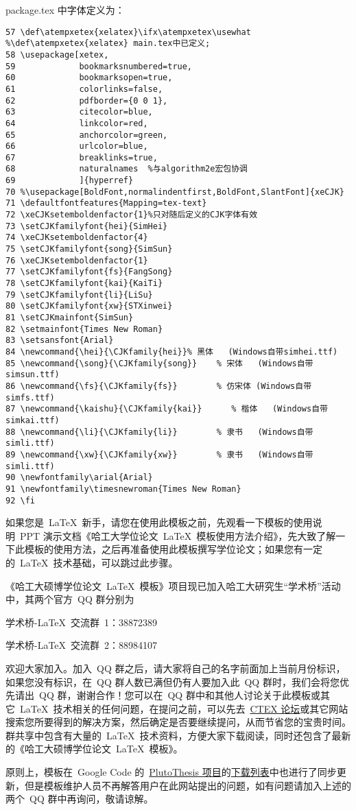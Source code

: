 package.tex 中字体定义为：
\begin{lstlisting}
57 \def\atempxetex{xelatex}\ifx\atempxetex\usewhat %\def\atempxetex{xelatex} main.tex中已定义;
58 \usepackage[xetex,
59             bookmarksnumbered=true,
60             bookmarksopen=true,
61             colorlinks=false,
62             pdfborder={0 0 1},
63             citecolor=blue,
64             linkcolor=red,
65             anchorcolor=green,
66             urlcolor=blue,
67             breaklinks=true,
68             naturalnames  %与algorithm2e宏包协调
69             ]{hyperref}
70 %\usepackage[BoldFont,normalindentfirst,BoldFont,SlantFont]{xeCJK}
71 \defaultfontfeatures{Mapping=tex-text}
72 \xeCJKsetemboldenfactor{1}%只对随后定义的CJK字体有效
73 \setCJKfamilyfont{hei}{SimHei}
74 \xeCJKsetemboldenfactor{4}
75 \setCJKfamilyfont{song}{SimSun}
76 \xeCJKsetemboldenfactor{1}
77 \setCJKfamilyfont{fs}{FangSong}
78 \setCJKfamilyfont{kai}{KaiTi}
79 \setCJKfamilyfont{li}{LiSu}
80 \setCJKfamilyfont{xw}{STXinwei}
81 \setCJKmainfont{SimSun}
82 \setmainfont{Times New Roman}
83 \setsansfont{Arial}
84 \newcommand{\hei}{\CJKfamily{hei}}% 黑体   (Windows自带simhei.ttf)
85 \newcommand{\song}{\CJKfamily{song}}    % 宋体   (Windows自带simsun.ttf)
86 \newcommand{\fs}{\CJKfamily{fs}}        % 仿宋体 (Windows自带simfs.ttf)
87 \newcommand{\kaishu}{\CJKfamily{kai}}      % 楷体   (Windows自带simkai.ttf)
88 \newcommand{\li}{\CJKfamily{li}}        % 隶书   (Windows自带simli.ttf)
89 \newcommand{\xw}{\CJKfamily{xw}}        % 隶书   (Windows自带simli.ttf)
90 \newfontfamily\arial{Arial}                                                                                                                                               
91 \newfontfamily\timesnewroman{Times New Roman}
92 \fi
\end{lstlisting}


如果您是~\LaTeX~新手，请您在使用此模板之前，先观看一下模板的使用说明~PPT 演示文档《哈工大学位论文~\LaTeX~模板使用方法介绍》，先大致了解一下此模板的使用方法，之后再准备使用此模板撰写学位论文；如果您有一定的~\LaTeX~技术基础，可以跳过此步骤。

《哈工大硕博学位论文~\LaTeX~模板》项目现已加入哈工大研究生“学术桥”活动中，其两个官方~QQ 群分别为

\centerline{学术桥-\LaTeX~交流群~1：38872389}
\centerline{学术桥-\LaTeX~交流群~2：88984107}
\noindent 欢迎大家加入。加入~QQ 群之后，请大家将自己的名字前面加上当前月份标识，如果您没有标识，在~QQ 群人数已满但仍有人要加入此~QQ 群时，我们会将您优先请出~QQ 群，谢谢合作！您可以在~QQ 群中和其他人讨论关于此模板或其它~\LaTeX~技术相关的任何问题，在提问之前，可以先去~\href{http://bbs.ctex.org/}{CTEX 论坛}或其它网站搜索您所要得到的解决方案，然后确定是否要继续提问，从而节省您的宝贵时间。群共享中包含有大量的~\LaTeX~技术资料，方便大家下载阅读，同时还包含了最新的《哈工大硕博学位论文~\LaTeX~模板》。

原则上，模板在~Google Code 的~\href{http://code.google.com/p/plutothesis/}{PlutoThesis 项目}的\href{http://code.google.com/p/plutothesis/downloads/list}{下载列表}中也进行了同步更新，但是模板维护人员不再解答用户在此网站提出的问题，如有问题请加入上述的两个~QQ 群中再询问，敬请谅解。
